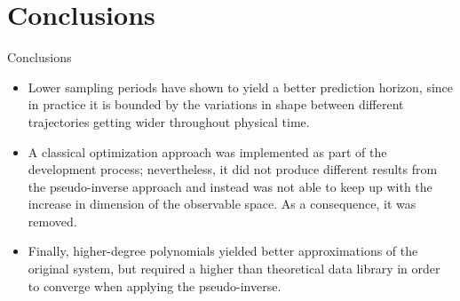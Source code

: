 \documentclass{beamer}
\begin{document}
\section{Conclusions}

\begin{frame}{Conclusions}
    \begin{itemize}
        \item Lower sampling periods have shown to yield a better prediction horizon, since in practice it is bounded by the variations in shape between different trajectories getting wider throughout physical time.
        \item A classical optimization approach was implemented as part of the development process; nevertheless, it did not produce different results from the pseudo-inverse approach and instead was not able to keep up with the increase in dimension of the observable space. As a consequence, it was removed.
        \item Finally, higher-degree polynomials yielded better approximations of the original system, but required a higher than theoretical data library in order to converge when applying the pseudo-inverse.
    \end{itemize}
\end{frame}
\end{document}
